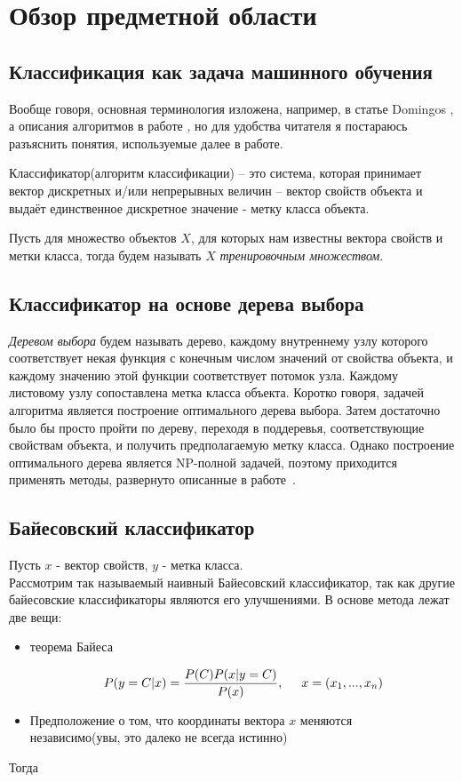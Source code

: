 \documentclass{article}
\begin{document}
\section{Обзор предметной области}
\subsection{Классификация как задача машинного обучения}
Вообще говоря, основная терминология изложена, например, в статье Domingos \cite{fewUseful}, а описания алгоритмов в работе \cite{wu2008top}, но для удобства читателя я постараюсь разъяснить понятия, используемые далее в работе. 

Классификатор(алгоритм классификации) -- это система, которая принимает вектор дискретных и/или непрерывных величин -- вектор свойств объекта и выдаёт единственное дискретное значение - метку класса объекта. 

Пусть для множество объектов $X$, для которых нам известны вектора свойств и метки класса, тогда будем называть $X$ \emph{тренировочным множеством}. 

\subsection{Классификатор на основе дерева выбора}
\emph{Деревом выбора} будем называть дерево, каждому внутреннему узлу которого соответствует некая функция с конечным числом значений от свойства объекта, и каждому значению этой функции соответствует потомок узла. Каждому листовому узлу сопоставлена метка класса объекта. Коротко говоря, задачей алгоритма является построение оптимального дерева выбора. Затем достаточно было бы просто пройти по дереву, переходя в поддеревья, соответствующие свойствам объекта, и получить предполагаемую метку класса. Однако построение оптимального дерева является NP-полной задачей, поэтому приходится применять методы, развернуто описанные в работе~\cite{desicionTree}.
\subsection{Байесовский классификатор}
Пусть $x$ - вектор свойств, $y$ - метка класса. \\
Рассмотрим так называемый наивный Байесовский классификатор, так как другие байесовские классификаторы являются его улучшениями. В основе метода лежат две вещи:
\begin{itemize}
\item{теорема Байеса}

\begin{equation}
P(y=C|x)=\frac{P(C) P(x|y=C)}{P(x)}
,\hspace{5mm} x = (x_1, ..., x_n)
\end{equation}

\item{Предположение о том, что координаты вектора $x$ меняются \\независимо(увы, это далеко не всегда истинно)}
\end{itemize}
Тогда
\end{document}

